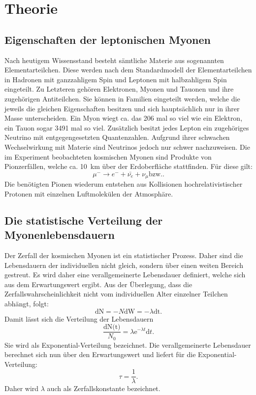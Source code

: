 
\section{Theorie}
\label{sec:Theorie}
\subsection{Eigenschaften der leptonischen Myonen}
Nach heutigem Wissensstand besteht sämtliche Materie aus sogenannten Elementarteilchen. Diese werden nach dem Standardmodell der Elementarteilchen in Hadronen mit ganzzahligem Spin und Leptonen mit halbzahligem Spin eingeteilt. Zu Letzteren gehören Elektronen, Myonen und Tauonen und ihre zugehörigen Antiteilchen. Sie können in Familien eingeteilt werden, welche die jeweils die gleichen Eigenschaften besitzen und sich hauptsächlich nur in ihrer Masse unterscheiden. Ein Myon wiegt ca. das 206 mal so viel wie ein Elektron, ein Tauon sogar 3491 mal so viel.  Zusätzlich besitzt jedes Lepton ein zugehöriges Neutrino mit entgegengesetzten Quantenzahlen. Aufgrund ihrer schwachen Wechselwirkung mit Materie sind Neutrinos jedoch nur schwer nachzuweisen. Die im Experiment beobachteten kosmischen Myonen sind Produkte von Pionzerfällen, welche ca. \SI{10}{\kilo\meter} über der Erdoberfläche stattfinden. Für diese gilt:
\begin{equation}
    \mu^- \to e^- + \bar{\nu_e} + \nu_{\mu} \text{bzw.}   .
\end{equation}  
Die benötigten Pionen wiederum entstehen aus Kollisionen hochrelativistischer Protonen mit einzelnen Luftmolekülen der Atmosphäre. 

\subsection{Die statistische Verteilung der Myonenlebensdauern}
Der Zerfall der kosmischen Myonen ist ein statistischer Prozess. Daher sind die Lebensdauern der individuellen nicht gleich, sondern über einen weiten Bereich gestreut. Es wird daher eine verallgemeinerte Lebensdauer definiert, welche sich aus dem Erwartungswert ergibt. Aus der Überlegung, dass die Zerfallswahrscheinlichkeit nicht vom individuellen Alter einzelner Teilchen abhängt, folgt:
\begin{equation}
    \text{dN} = -N \text{dW} = - \lambda \text{dt}.
\end{equation}
Damit lässt sich die Verteilung der Lebensdauern
\begin{equation}
    \frac{\text{dN(t)}}{N_0} = \lambda \text{e}^{-\lambda t} \text{d}t \text{.}
\end{equation}
Sie wird als Exponential-Verteilung bezeichnet. Die verallgemeinerte Lebensdauer berechnet sich nun über den Erwartungswert und liefert für die Exponential-Verteilung:
\begin{equation}
    \tau = \frac{1}{\lambda}\text{.}
\end{equation}
Daher wird $\lambda$ auch als Zerfallskonstante bezeichnet.